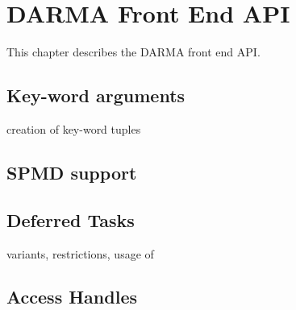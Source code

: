 \chapter{DARMA Front End API}
\label{chap:front_end}
This chapter describes the DARMA \gls{front end} \gls{API}. 

\section{Key-word arguments}
\label{sec:key-word}

creation of key-word tuples


\section{SPMD support}
\label{sec:spmd}





\section{Deferred Tasks}
\label{sec:deferred}

variants, restrictions, usage of 


\section{Access Handles}
\label{sec:handles}








